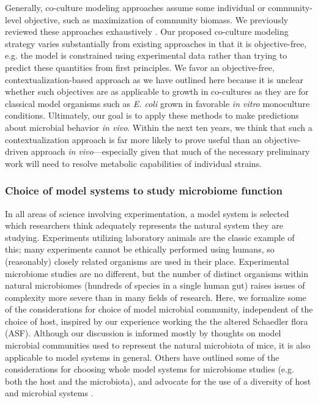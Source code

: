 \documentclass[11pt,twocolumn,notitlepage,openany,twoside]{book}
\begin{document}
\begin{refsection}
Generally, co-culture modeling approaches assume some individual or community-level objective, such as maximization of community biomass. We previously reviewed these approaches exhaustively \cite{Biggs2015-lz}. Our proposed co-culture modeling strategy varies substantially from existing approaches in that it is objective-free, e.g. the model is constrained using experimental data rather than trying to predict these quantities from first principles. We favor an objective-free, contextualization-based approach as we have outlined here because it is unclear whether such objectives are as applicable to growth in co-cultures as they are for classical model organisms such as \textit{E. coli} grown in favorable \textit{in vitro} monoculture conditions. Ultimately, our goal is to apply these methods to make predictions about microbial behavior \textit{in vivo}. Within the next ten years, we think that such a contextualization approach is far more likely to prove useful than an objective-driven approach \textit{in vivo}---especially given that much of the necessary preliminary work will need to resolve metabolic capabilities of individual strains.

\subsubsection{Choice of model systems to study microbiome function}

In all areas of science involving experimentation, a model system is selected which researchers think adequately represents the natural system they are studying. Experiments utilizing laboratory animals are the classic example of this; many experiments cannot be ethically performed using humans, so (reasonably) closely related organisms are used in their place. Experimental microbiome studies are no different, but the number of distinct organisms within natural microbiomes (hundreds of species in a single human gut) raises issues of complexity more severe than in many fields of research.  Here, we formalize some of the considerations for choice of model microbial community, independent of the choice of host, inspired by our experience working the the altered Schaedler flora (ASF). Although our discussion is informed mostly by thoughts on model microbial communities used to represent the natural microbiota of mice, it is also applicable to model systems in general. Others have outlined some of the considerations for choosing whole model systems for microbiome studies (e.g. both the host and the microbiota), and advocate for the use of a diversity of host and microbial systems \cite{Douglas2018-oj}.


\end{refsection}
\end{document}

